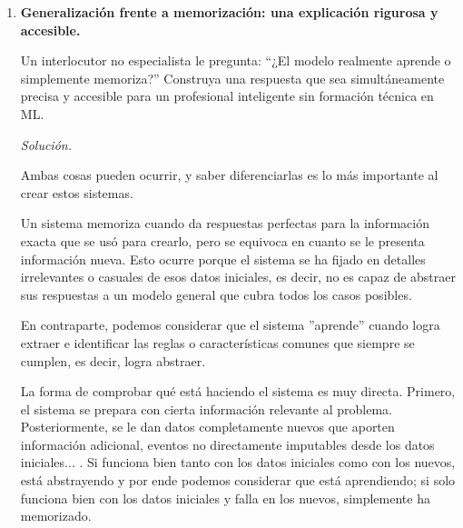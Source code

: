 \documentclass[12pt]{article}
\newcommand\sol[1]{\begin{mdframed}
\emph{Solución.} #1
\end{mdframed}}
\begin{document}
\begin{enumerate}
{El control del sobreajuste descansa en tres pilares: una validación walk-forward, dejando una
separación temporal entre el entrenamiento y la validación para evitar que se solapen observaciones;
la regularización en todos los modelos base; y la monitorización fuera de muestra de la capacidad
predictiva a lo largo del tiempo, reiniciando el pipeline si decae.

Para la evaluación conviene combinar métricas estadísticas y económicas. Entre las primeras, la
correlación de Spearman entre la señal y el retorno realizado y la calidad de la calibración de las
probabilidades. Entre las económicas, el Sharpe ratio de la estrategia long/short, el máximo
drawdown y el turnover con su coste de transacción estimado, que indican si el acierto estadístico
llega a traducirse en valor para la estrategia.
}

\item \textbf{Generalización frente a memorización: una explicación rigurosa y accesible.}

Un interlocutor no especialista le pregunta: ``¿El modelo realmente aprende o simplemente
memoriza?'' Construya una respuesta que sea simultáneamente precisa y accesible para un profesional
inteligente sin formación técnica en ML.

\sol{

Ambas cosas pueden ocurrir, y saber diferenciarlas es lo más importante al crear estos sistemas.

\medskip
Un sistema memoriza cuando da respuestas perfectas para la información exacta que se usó para crearlo,
pero se equivoca en cuanto se le presenta información nueva. Esto ocurre porque el sistema se ha fijado
en detalles irrelevantes o casuales de esos datos iniciales, es decir, no es capaz de abstraer sus respuestas a un modelo general que cubra todos los casos posibles.

\medskip
En contraparte, podemos considerar que el sistema ''aprende'' cuando logra extraer e identificar las reglas o
características comunes que siempre se cumplen, es decir, logra abstraer.

\medskip
La forma de comprobar qué está haciendo el sistema es muy directa. Primero, el sistema se prepara con cierta información relevante al problema. Posteriormente, se le dan datos completamente nuevos que aporten información adicional, eventos no directamente imputables desde los datos iniciales... .
Si funciona bien tanto con los datos iniciales como con los nuevos, está abstrayendo y por ende podemos considerar que está aprendiendo; si solo
funciona bien con los datos iniciales y falla en los nuevos, simplemente ha memorizado.

}
\end{enumerate}
\end{document}
